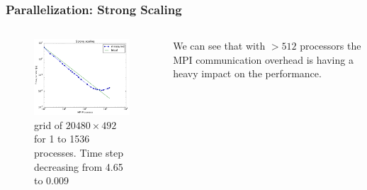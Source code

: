 \documentclass{beamer}
\begin{document}
%
%
%
\begin{frame}
\frametitle{Parallelization: Strong Scaling}

\begin{minipage}[1\textheight]{\textwidth}
\begin{columns}[T]
\begin{column}{0.7\textwidth}
\begin{figure}
\includegraphics[width=6.55cm]{strongscale.pdf}
\caption{grid of $20480\times 492$ for 1 to 1536 processes. Time step decreasing from 4.65 to 0.009}
\end{figure}
\end{column}

\begin{column}{0.3\textwidth}
\justify
We can see that with $>512$ processors the MPI communication overhead is having a heavy impact on the performance.


\end{column}
\end{columns}
\end{minipage}


\end{frame}
\end{document}
